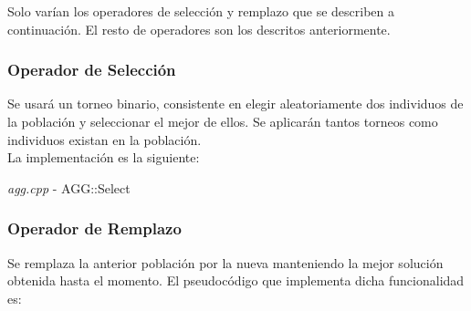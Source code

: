 \documentclass[a4paper, 12pt]{article}
\begin{document}
      Solo varían los operadores de selección y remplazo que se describen a continuación. El resto de operadores son los descritos anteriormente.
      
      \newpage
      \subsubsection*{Operador de Selección}
      Se usará un torneo binario, consistente en elegir aleatoriamente dos individuos de la población y seleccionar el mejor de ellos. Se aplicarán tantos torneos como individuos existan en la población.\\
      
      La implementación es la siguiente:\\
      \begin{algorithm}[H]
       	\caption{\textit{agg.cpp} - AGG::Select}
       	
         \Def{Select($P$)}{
         	\For{$i = 1$ \KwTo $n$}{
				$r1 = $ random in $[0, n)$\\
            	$r2 = $ random in $[0, n)$\\        	
         	
         		\If{coste $P_{r1}$ desconocido}{
            		Calcula coste $P_{r1}$\\
            		evaluaciones++\\
            	}
            	\If{coste $P_{r2}$ desconocido}{
            		Calcula coste $P_{r2}$\\
            		evaluaciones++\\
            	}
            	
            	\If{coste $P_{r1} \leq P_{r2}$}{
            		$P'_i = P_{r1}$\\
            	} \Else {
					$P'_i = P_{r2}$\\
            	}
         	}
                    
            
            \textbf{return} $P'$\\
         }
      \end{algorithm}
      
      
      \newpage
      \subsubsection*{Operador de Remplazo}
      Se remplaza la anterior población por la nueva manteniendo la mejor solución obtenida hasta el momento. El pseudocódigo que implementa dicha funcionalidad es:\\
      
\end{document}

